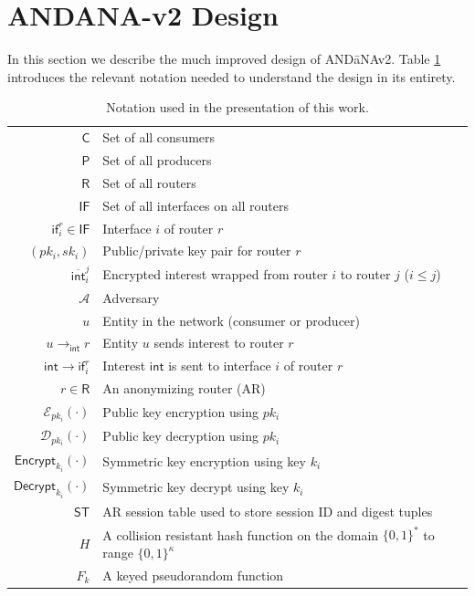 \section{ANDANA-v2 Design} \label{sec:design}
In this section we describe the much improved design of {\sf AND\=aNAv2}. Table \ref{tab:notation} introduces the relevant notation needed to understand the design in its entirety. 

\begin{table}
\centering
\caption{Notation used in the presentation of this work.}
\label{tab:notation}
  \begin{tabular}{| r | l |} \hline
  $\mathsf{C}$ & Set of all consumers  \\
  $\mathsf{P}$ & Set of all producers  \\ 
  $\mathsf{R}$ & Set of all routers  \\
  $\mathsf{IF}$ & Set of all interfaces on all routers  \\
  $\mathsf{if}_i^r \in \mathsf{IF}$ & Interface $i$ of router $r$  \\
  $(pk_i, sk_i)$ & Public/private key pair for router $r$  \\
  $\overline{\mathsf{int}}_{i}^{j}$ & Encrypted interest wrapped from router $i$ to router $j$ ($i \leq j$)  \\
  $\mathcal{A}$ & Adversary \\ 
  $u$ & Entity in the network (consumer or producer) \\
  $u \to_{\mathsf{int}} r$ & Entity $u$ sends interest to router $r$  \\ 
  $\mathsf{int} \to \mathsf{if}_i^r$ & Interest $\mathsf{int}$ is sent to interface $i$ of router $r$ \\
  $r \in \mathsf{R}$ & An anonymizing router (AR) \\ 
  $\mathcal{E}_{pk_i}(\cdot)$ & Public key encryption using $pk_i$ \\ 
  $\mathcal{D}_{pk_i}(\cdot)$ & Public key decryption using $pk_i$ \\ 
  $\mathsf{Encrypt}_{k_i}(\cdot)$ & Symmetric key encryption using key $k_i$ \\ 
  $\mathsf{Decrypt}_{k_i}(\cdot)$ & Symmetric key decrypt using key $k_i$ \\ 
  $\mathsf{ST}$ & AR session table used to store session ID and digest tuples \\
  $H$ & A collision resistant hash function on the domain $\{0,1\}^*$ to range $\{0,1\}^{\kappa}$ \\
  $F_k$ & A keyed pseudorandom function \\ \hline
  \end{tabular}
\end{table}

